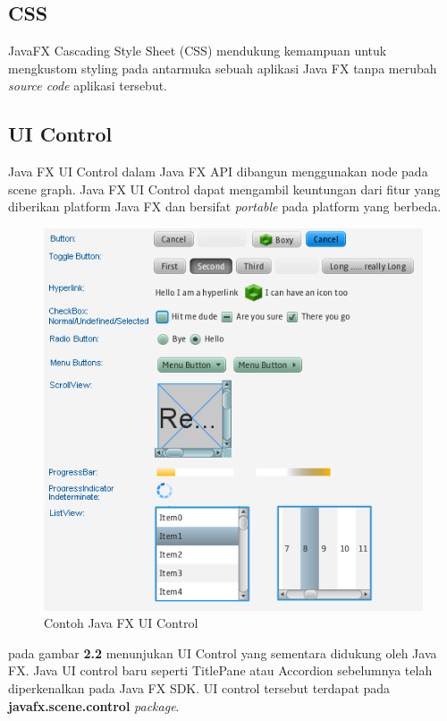 \subsection{CSS}
JavaFX Cascading Style Sheet (CSS) mendukung kemampuan untuk mengkustom styling pada antarmuka sebuah aplikasi Java FX tanpa merubah \textit{source code} aplikasi tersebut.\cite{javafx}   

\subsection{UI Control}
Java FX UI Control dalam Java FX API dibangun menggunakan node pada scene graph. Java FX UI Control dapat mengambil keuntungan dari fitur yang diberikan platform Java FX dan bersifat \textit{portable} pada platform yang berbeda.\cite{javafx}

\begin{figure}[H]
	\centering
	\includegraphics[scale=0.8]{Gambar/JavaFXuicontrols}
	\caption{Contoh Java FX UI Control}
	\end{figure}
	
	pada gambar \textbf{2.2} menunjukan UI Control yang sementara didukung oleh Java FX. Java UI control baru seperti TitlePane atau Accordion sebelumnya telah diperkenalkan pada Java FX SDK. UI control tersebut terdapat pada \textbf{javafx.scene.control} \textit{package}.\cite{javafx}
 
